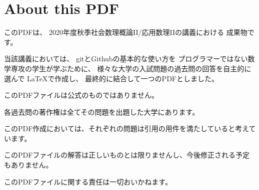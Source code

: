 \documentclass[main]{subfiles}
\begin{document}
\section*{About this PDF}
このPDFは、
2020年度秋季社会数理概論II/応用数理IIの講義における
成果物です。

当該講義においては、
gitとGithubの基本的な使い方を
プログラマーではない数学専攻の学生が学ぶために、
様々な大学の入試問題の過去問の回答を自主的に選んで
\LaTeX で作成し、
最終的に結合して一つのPDFとしました。

このPDFファイルは公式のものではありません。

各過去問の著作権は全てその問題を出題した大学にあります。

このPDF作成においては、それぞれの問題は引用の用件を満たしていると考えています。

このPDFファイルの解答は正しいものとは限りませんし、今後修正される予定もありません。

このPDFファイルに関する責任は一切おいかねます。
\end{document}

